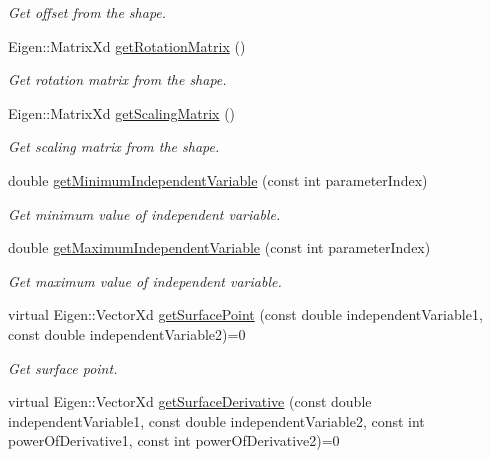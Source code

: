 \begin{DoxyCompactItemize}
\begin{DoxyCompactList}\small\item\em Get offset from the shape. \end{DoxyCompactList}\item 
Eigen\+::\+Matrix\+Xd \hyperlink{classtudat_1_1geometric__shapes_1_1SingleSurfaceGeometry_aaf75807f06b998e8c8aaa3f6ef537f85}{get\+Rotation\+Matrix} ()
\begin{DoxyCompactList}\small\item\em Get rotation matrix from the shape. \end{DoxyCompactList}\item 
Eigen\+::\+Matrix\+Xd \hyperlink{classtudat_1_1geometric__shapes_1_1SingleSurfaceGeometry_adcfa4b03a384ce4982b62136c018f91f}{get\+Scaling\+Matrix} ()
\begin{DoxyCompactList}\small\item\em Get scaling matrix from the shape. \end{DoxyCompactList}\item 
double \hyperlink{classtudat_1_1geometric__shapes_1_1SingleSurfaceGeometry_afd3d72e02db05e1ccb8702e73b42be01}{get\+Minimum\+Independent\+Variable} (const int parameter\+Index)
\begin{DoxyCompactList}\small\item\em Get minimum value of independent variable. \end{DoxyCompactList}\item 
double \hyperlink{classtudat_1_1geometric__shapes_1_1SingleSurfaceGeometry_a0c27b60cd7bb0dabd008c8512b9329b0}{get\+Maximum\+Independent\+Variable} (const int parameter\+Index)
\begin{DoxyCompactList}\small\item\em Get maximum value of independent variable. \end{DoxyCompactList}\item 
virtual Eigen\+::\+Vector\+Xd \hyperlink{classtudat_1_1geometric__shapes_1_1SingleSurfaceGeometry_aec5c9957aa261662b34ddb0acf5eac40}{get\+Surface\+Point} (const double independent\+Variable1, const double independent\+Variable2)=0
\begin{DoxyCompactList}\small\item\em Get surface point. \end{DoxyCompactList}\item 
virtual Eigen\+::\+Vector\+Xd \hyperlink{classtudat_1_1geometric__shapes_1_1SingleSurfaceGeometry_ad5d412eff63b46b71cc774d222131795}{get\+Surface\+Derivative} (const double independent\+Variable1, const double independent\+Variable2, const int power\+Of\+Derivative1, const int power\+Of\+Derivative2)=0

\end{DoxyCompactItemize}

